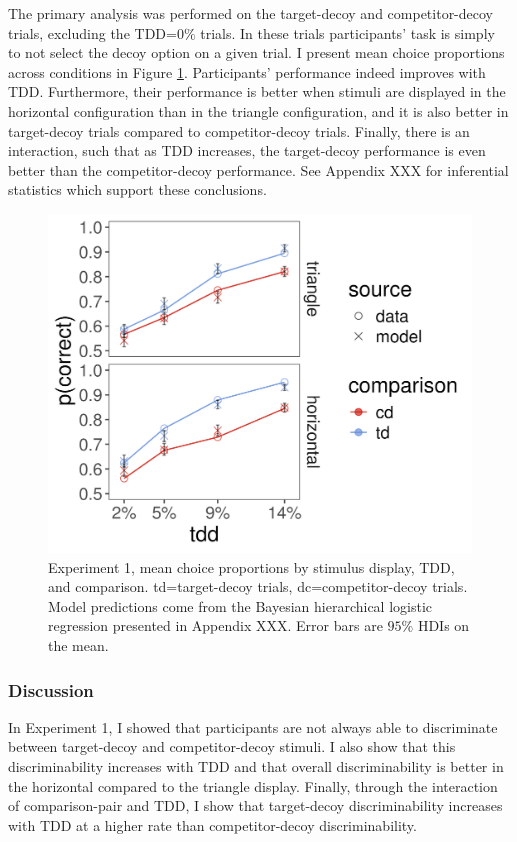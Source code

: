 {{The primary analysis was performed on the target-decoy and competitor-decoy trials, excluding the TDD=$0\%$ trials. In these trials participants' task is simply to not select the decoy option on a given trial. I present mean choice proportions across conditions in Figure \ref{fig:e1_data}. Participants' performance indeed improves with TDD. Furthermore, their performance is better when stimuli are displayed in the horizontal configuration than in the triangle configuration, and it is also better in target-decoy trials compared to competitor-decoy trials. Finally, there is an interaction, such that as TDD increases, the target-decoy performance is even better than the competitor-decoy performance. See Appendix XXX for inferential statistics which support these conclusions.

\begin{figure}
   \includegraphics[width=\textwidth]{figures/m13_model_preds_v_data.jpeg}
   \caption{Experiment 1, mean choice proportions by stimulus display, TDD, and comparison. td=target-decoy trials, dc=competitor-decoy trials. Model predictions come from the Bayesian hierarchical logistic regression presented in Appendix XXX. Error bars are $95\%$ HDIs on the mean.}
   \label{fig:e1_data}
\end{figure}

\subsubsection{Discussion}
In Experiment 1, I showed that participants are not always able to discriminate between target-decoy and competitor-decoy stimuli. I also show that this discriminability increases with TDD and that overall discriminability is better in the horizontal compared to the triangle display. Finally, through the interaction of comparison-pair and TDD, I show that target-decoy discriminability increases with TDD at a higher rate than competitor-decoy discriminability. 

}}
